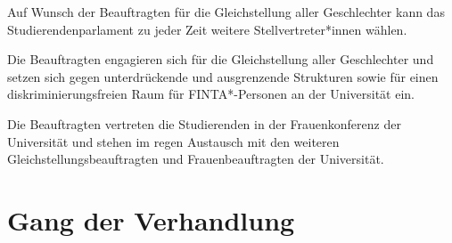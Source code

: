 \documentclass[10pt,a4paper]{scrartcl}
\begin{document}
\begin{contract}
Auf Wunsch der Beauftragten für die Gleichstellung aller Geschlechter kann das Studierendenparlament zu jeder Zeit weitere Stellvertreter*innen wählen.

Die Beauftragten engagieren sich für die Gleichstellung aller Geschlechter und setzen sich gegen unterdrückende und ausgrenzende Strukturen sowie für einen diskriminierungsfreien Raum für FINTA*-Personen an der Universität ein.

Die Beauftragten vertreten die Studierenden in der Frauenkonferenz der Universität und stehen im regen Austausch mit den weiteren Gleichstellungsbeauftragten und Frauenbeauftragten der Universität.

\end{contract}


\section{Gang der Verhandlung}\label{gang-der-verhandlung}
\end{document}
